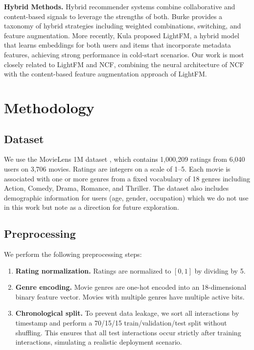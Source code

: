 \documentclass{article}
\begin{document}
\textbf{Hybrid Methods.} Hybrid recommender systems combine collaborative and content-based signals to leverage the strengths of both. Burke \cite{burke2002hybrid} provides a taxonomy of hybrid strategies including weighted combinations, switching, and feature augmentation. More recently, Kula \cite{kula2015metadata} proposed LightFM, a hybrid model that learns embeddings for both users and items that incorporate metadata features, achieving strong performance in cold-start scenarios. Our work is most closely related to LightFM and NCF, combining the neural architecture of NCF with the content-based feature augmentation approach of LightFM.

\section{Methodology}

\subsection{Dataset}
We use the MovieLens 1M dataset \cite{harper2015movielens}, which contains 1,000,209 ratings from 6,040 users on 3,706 movies. Ratings are integers on a scale of 1--5. Each movie is associated with one or more genres from a fixed vocabulary of 18 genres including Action, Comedy, Drama, Romance, and Thriller. The dataset also includes demographic information for users (age, gender, occupation) which we do not use in this work but note as a direction for future exploration.

\subsection{Preprocessing}
We perform the following preprocessing steps:
\begin{enumerate}
    \item \textbf{Rating normalization.} Ratings are normalized to $[0, 1]$ by dividing by 5.
    \item \textbf{Genre encoding.} Movie genres are one-hot encoded into an 18-dimensional binary feature vector. Movies with multiple genres have multiple active bits.
    \item \textbf{Chronological split.} To prevent data leakage, we sort all interactions by timestamp and perform a 70/15/15 train/validation/test split without shuffling. This ensures that all test interactions occur strictly after training interactions, simulating a realistic deployment scenario.
\end{enumerate}
\end{document}
